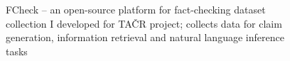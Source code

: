 \label{sec:datasets}
\begin{figure}
    \caption{{\techbf FCheck} -- an open-source platform for fact-checking dataset collection I developed for TAČR project; collects data for claim generation, information retrieval and natural language inference tasks}
    \label{fig:fcheck}
\end{figure}
